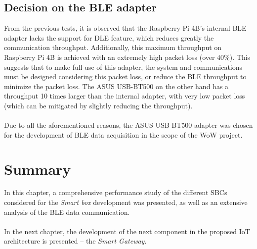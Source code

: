 \subsection{Decision on the \acs{BLE} adapter}

From the previous tests, it is observed that the Raspberry Pi 4B's internal \acs{BLE} adapter lacks the support for \acs{DLE} feature, which reduces greatly the communication throughput. Additionally, this maximum throughput on Raspberry Pi 4B is achieved with an extremely high packet loss (over 40\%). This suggests that to make full use of this adapter, the system and communications must be designed considering this packet loss, or reduce the \acs{BLE} throughput to minimize the packet loss. The ASUS USB-BT500 on the other hand has a throughput 10 times larger than the internal adapter, with very low packet loss (which can be mitigated by slightly reducing the throughput).

\paragraph{} Due to all the aforementioned reasons, the ASUS USB-BT500 adapter was chosen for the development of \acs{BLE} data acquisition in the scope of the \acs{WoW} project.

\section{Summary}
In this chapter, a comprehensive performance study of the different \acs{SBC}s considered for the \textit{Smart box} development was presented, as well as an extensive analysis of the \acs{BLE} data communication.

\paragraph{} In the next chapter, the development of the next component in the proposed \acs{IoT} architecture is presented -- the \textit{Smart Gateway}.